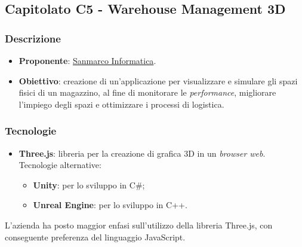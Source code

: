 \subsection{Capitolato C5 - Warehouse Management 3D}

\subsubsection{Descrizione}
\begin{itemize}
    \item \textbf{Proponente}: 
		\href{https://www.sanmarcoinformatica.com/}{Sanmarco Informatica}.
    \item \textbf{Obiettivo}:  creazione di un'applicazione per 
		visualizzare e simulare gli spazi fisici di un magazzino, al fine di monitorare le \textit{performance}, migliorare l'impiego degli spazi e ottimizzare i processi di logistica.
\end{itemize}


\subsubsection{Tecnologie}
\begin{itemize}
    \item \textbf{Three.js}: libreria per la creazione di grafica 3D in un 
		\textit{browser web}. Tecnologie alternative:
        \begin{itemize}
            \item \textbf{Unity}: per lo sviluppo in C\#;
	        \item \textbf{Unreal Engine}: per lo sviluppo in C++.
        \end{itemize}
\end{itemize}
L'azienda ha posto maggior enfasi sull'utilizzo della libreria Three.js, con conseguente preferenza del linguaggio JavaScript.


